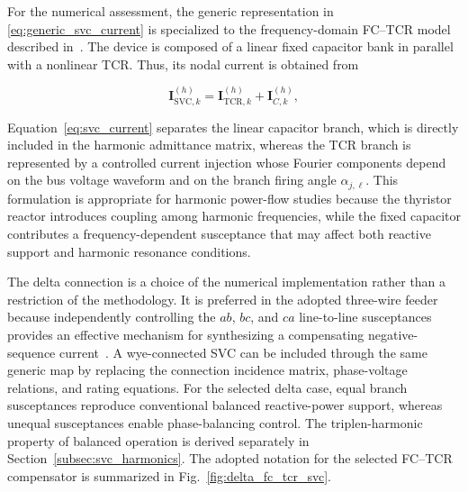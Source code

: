 \documentclass[journal]{IEEEtran}
\begin{document}
For the numerical assessment, the generic representation in
\eqref{eq:generic_svc_current} is specialized to the frequency-domain FC--TCR
model described in~\cite{MathurVarma2002,Arruda2003}. The device is composed
of a linear fixed capacitor bank in parallel with a nonlinear TCR. Thus, its
nodal current is obtained from

\begin{equation}
    \mathbf{I}^{(h)}_{\mathrm{SVC},k} =
    \mathbf{I}^{(h)}_{\mathrm{TCR},k} +
    \mathbf{I}^{(h)}_{C,k},
    \label{eq:svc_current}
\end{equation}

Equation~\eqref{eq:svc_current} separates the linear capacitor branch, which
is directly included in
the harmonic admittance matrix, whereas the TCR branch is represented by a
controlled current injection whose Fourier components depend on the bus
voltage waveform and on the branch firing angle $\alpha_{j,\ell}$. This formulation is
appropriate for harmonic power-flow studies because the thyristor reactor
introduces coupling among harmonic frequencies, while the fixed capacitor
contributes a frequency-dependent susceptance that may affect both reactive
support and harmonic resonance conditions.

The delta connection is a choice of the numerical implementation rather than a
restriction of the methodology. It is preferred in the adopted three-wire
feeder because independently controlling the $ab$, $bc$, and $ca$ line-to-line
susceptances provides an effective mechanism for synthesizing a compensating
negative-sequence current~\cite{Chen1999SVCBalance}. A wye-connected SVC can be
included through the same generic map by replacing the connection incidence
matrix, phase-voltage relations, and rating equations. For the selected delta
case, equal branch susceptances reproduce conventional balanced reactive-power
support, whereas unequal susceptances enable phase-balancing control. The
triplen-harmonic property of balanced operation is derived separately in
Section~\ref{subsec:svc_harmonics}. The adopted notation for the selected
FC--TCR compensator is summarized in
Fig.~\ref{fig:delta_fc_tcr_svc}.
\end{document}
